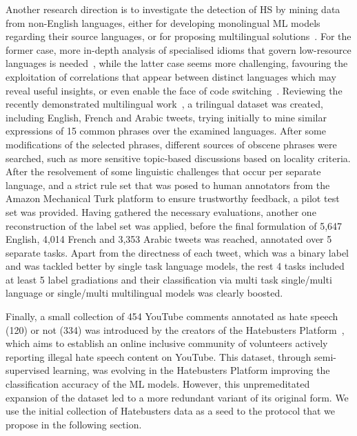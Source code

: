 \documentclass[sigconf]{acmart}
\begin{document}
Another research direction is to investigate the detection of HS by mining data from non-English languages, either for developing monolingual ML models regarding their source languages, or for proposing multilingual solutions~\cite{DBLP:conf/lrec/SanguinettiPBPS18, DBLP:conf/emnlp/OusidhoumLZSY19}. For the former case, more in-depth analysis of specialised idioms that govern low-resource languages is needed~\cite{DBLP:conf/ifip12/2019aiaiw, DBLP:journals/corr/abs-2003-07459}, while the latter case seems more challenging, favouring the exploitation of correlations that appear between distinct languages which may reveal useful insights, or even enable the face of code switching~\cite{DBLP:conf/coling/GaleryC18}. Reviewing the recently demonstrated multilingual work~\cite{DBLP:conf/emnlp/OusidhoumLZSY19}, a trilingual dataset was created, including English, French and Arabic tweets, trying initially to mine similar expressions of 15 common phrases over the examined languages. After some modifications of the selected phrases, different sources of obscene phrases were searched, such as more sensitive topic-based discussions based on locality criteria. After the resolvement of some linguistic challenges that occur per separate language, and a strict rule set that was posed to human annotators from the Amazon Mechanical Turk platform to ensure trustworthy feedback, a pilot test set was provided. Having gathered the necessary evaluations, another one reconstruction of the label set was applied, before the final formulation of 5,647 English, 4,014 French and 3,353 Arabic tweets was reached, annotated over 5 separate tasks. Apart from the directness of each tweet, which was a binary label and was tackled better by single task language models, the rest 4 tasks included at least 5 label gradiations and their classification via multi task single/multi language or single/multi multilingual models was clearly boosted.

Finally, a small collection of 454 YouTube comments annotated as hate speech (120) or not (334) was introduced by the creators of the Hatebusters Platform~\cite{hatebusters}, which aims to establish an online inclusive community of volunteers actively reporting illegal hate speech content on YouTube. This dataset, through semi-supervised learning, was evolving in the Hatebusters Platform improving the classification accuracy of the ML models. However, this unpremeditated expansion of the dataset led to a more redundant variant of its original form. We use the initial collection of Hatebusters data as a seed to the protocol that we propose in the following section.
\end{document}
